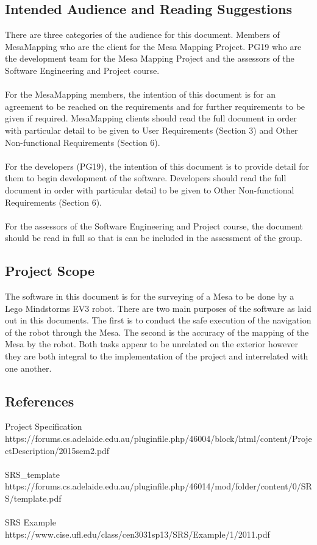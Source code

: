 \documentclass[11pt, a4paper]{article}
\begin{document}
\subsection{Intended Audience and Reading Suggestions}
There are three categories of the audience for this document. Members of MesaMapping who are the client for the Mesa Mapping Project. PG19 who are the development team for the Mesa Mapping Project and the assessors of the Software Engineering and Project course.\\
\\
For the MesaMapping members, the intention of this document is for an agreement to be reached on the requirements and for further requirements to be given if required. MesaMapping clients should read the full document in order with particular detail to be given to User Requirements (Section 3) and Other Non-functional Requirements (Section 6).\\
\\
For the developers (PG19), the intention of this document is to provide detail for them to begin development of the software. Developers should read the full document in order with particular detail to be given to Other Non-functional Requirements (Section 6).\\
\\
For the assessors of the Software Engineering and Project course, the document should be read in full so that is can be included in the assessment of the group.

\subsection{Project Scope}
The software in this document is for the surveying of a Mesa to be done by a Lego Mindstorms EV3 robot. There are two main purposes of the software as laid out in this documents. The first is to conduct the safe execution of the navigation of the robot through the Mesa. The second is the accuracy of the mapping of the Mesa by the robot. Both tasks appear to be unrelated on the exterior however they are both integral to the implementation of the project and interrelated with one another.

\subsection{References}
Project Specification\\
https://forums.cs.adelaide.edu.au/pluginfile.php/46004/block/html/content/ProjectDescription/2015sem2.pdf\\
\\
SRS\_template\\
https://forums.cs.adelaide.edu.au/pluginfile.php/46014/mod/folder/content/0/SRS/template.pdf\\
\\
SRS Example\\
https://www.cise.ufl.edu/class/cen3031sp13/SRS/Example/1/2011.pdf
\end{document}
